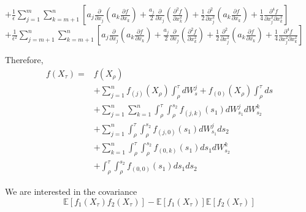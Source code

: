 \documentclass[12pt]{article}
\begin{document}
\begin{itemize}
$+ \frac{1}{\epsilon} \sum_{j=1}^m \sum_{k= m+1}^n \left[ a_j \frac{\partial}{\partial x_j} \left( a_k \frac{\partial f}{\partial x_k} \right) + \frac{a_j}{2} \frac{\partial}{\partial x_j} \left( \frac{\partial^2 f}{\partial x_k^2} \right) + \frac{1}{2} \frac{\partial^2}{\partial x_j^2} \left( a_k \frac{\partial f}{\partial x_k} \right) + \frac{1}{4} \frac{\partial^4 f}{\partial x_j^2 \partial x_k^2} \right] $\\
$+ \frac{1}{\epsilon^2} \sum_{j=m+1}^n \sum_{k=m+1}^n \left[ a_j \frac{\partial}{\partial x_j} \left( a_k \frac{\partial f}{\partial x_k} \right) + \frac{a_j}{2} \frac{\partial}{\partial x_j} \left( \frac{\partial^2 f}{\partial x_k^2} \right) + \frac{1}{2} \frac{\partial^2}{\partial x_j^2} \left( a_k \frac{\partial f}{\partial x_k} \right) + \frac{1}{4} \frac{\partial^4 f}{\partial x_j^2 \partial x_k^2} \right]  $
\end{itemize}

Therefore, 
\begin{equation} 
\begin{aligned}
f( X_\tau) =& f(X_\rho) \\
& + \sum_{j=1}^n f_{(j)} (X_\rho) \int_\rho^\tau dW_s^j 
  + f_{(0)} (X_\rho) \int_\rho^\tau ds \\
& + \sum_{j=1}^n \sum_{k=1}^n \int_\rho^\tau \int_\rho^{s_2} f_{(j,k)} (s_1) dW_{s_1}^j dW_{s_2}^k \\
& + \sum_{j=1}^n \int_\rho^\tau \int_\rho^{s_2} f_{(j,0)} (s_1) dW_{s_1}^j ds_2 \\
& + \sum_{k=1}^n \int_\rho^\tau \int_\rho^{s_2} f_{(0,k)} (s_1) ds_1 dW_{s_2}^k \\
& + \int_\rho^\tau \int_\rho^{s_2} f_{(0,0)} (s_1) ds_1 ds_2 
\end{aligned}
\end{equation}


We are interested in the covariance
\begin{equation}
\mathbb{E}\left[ f_1(X_\tau) f_2(X_\tau) \right] - \mathbb{E}\left[ f_1(X_\tau) \right] \mathbb{E}\left[ f_2(X_\tau) \right]  
\end{equation}
\end{document}
